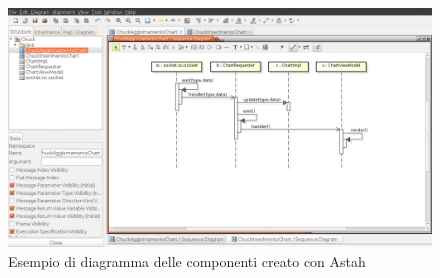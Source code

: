 				\begin{figure}[H]
					\centering
					\includegraphics[width=0.8
					\textwidth]{NormeDiProgetto/Pics/SequenzaAstah.png}
					\caption{Esempio di diagramma delle componenti creato con Astah}
				\end{figure}


